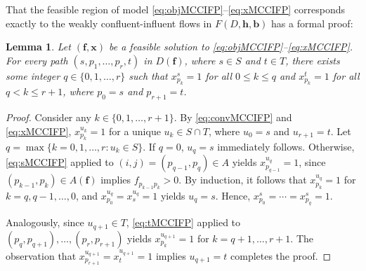 \documentclass[pdflatex,sn-mathphys-num]{sn-jnl}%
\theoremstyle{thmstyleone}%
\newtheorem{lemma}[theorem]{Lemma}%
\begin{document}
That the feasible region of model \eqref{eq:objMCCIFP}--\eqref{eq:xMCCIFP} corresponds exactly to the weakly confluent-influent flows in $F(D,\boldsymbol{h},\boldsymbol{b})$ has a formal proof:
\begin{lemma} \label{lem:MCCIFP}
Let $(\boldsymbol{f},\boldsymbol{x})$ be a feasible solution to \eqref{eq:objMCCIFP}--\eqref{eq:xMCCIFP}.
For every path $(s,p_1,\ldots,p_r,t)$ in $D(\boldsymbol{f})$, where $s\in S$ and $t\in T$,
there exists some integer $q\in\{0,1,\ldots,r\}$ such that $x_{p_k}^s=1$ for all $0\leq k\leq q$ and $x_{p_k}^t=1$ for all $q<k\leq r+1$, where $p_0=s$ and $p_{r+1}=t$.
\end{lemma}
\begin{proof}
Consider any $k\in\{0,1,\ldots,r+1\}$.
By \eqref{eq:convMCCIFP} and \eqref{eq:xMCCIFP}, $x_{p_k}^{u_k}=1$ for a unique $u_k\in S\cap T$, where $u_0=s$ and $u_{r+1}=t$.
Let $q=\max\{k=0,1,\ldots,r: u_k\in S\}$.
If $q=0$, $u_q=s$ immediately follows.
Otherwise, \eqref{eq:sMCCIFP} applied to $(i,j)=(p_{q-1},p_q)\in A$ yields $x_{p_{q-1}}^{u_q}=1$, since $(p_{k-1},p_k)\in A(\boldsymbol{f})$ implies $f_{p_{k-1}p_k}>0$.
By induction, it follows that $x_{p_k}^{u_q}=1$ for $k=q,q-1,\ldots,0$, and $x_{p_0}^{u_q}=x_s^{u_q}=1$ yields $u_q=s$.
Hence, $x_{p_0}^s=\cdots=x_{p_q}^s=1$.

Analogously, since $u_{q+1}\in T$, \eqref{eq:tMCCIFP} applied to $(p_q,p_{q+1}),\ldots,(p_r,p_{r+1})$ yields $x_{p_k}^{u_{q+1}}=1$ for $k=q+1,\ldots,r+1$.
The observation that $x_{p_{r+1}}^{u_{q+1}}=x_{t}^{u_{q+1}}=1$ implies $u_{q+1}=t$ completes the proof.
\end{proof}
\end{document}
